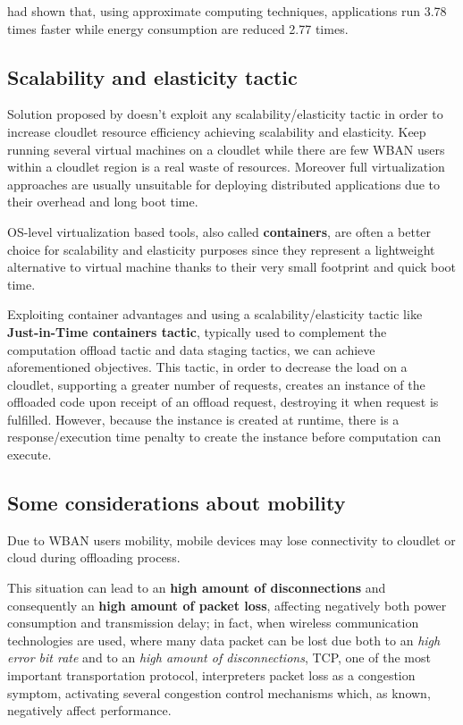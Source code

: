 \documentclass[sigchi]{acmart}
\begin{document}
\citet{ApproximateComputingArticle} had shown that, using approximate computing techniques, applications run 3.78 times faster while energy consumption are reduced 2.77 times.

\subsection{Scalability and elasticity tactic}

Solution proposed by \citet{MSAReport} doesn't exploit any scalability/elasticity tactic in order to increase cloudlet resource efficiency achieving scalability and elasticity. Keep running several virtual machines on a cloudlet while there are few WBAN users within a cloudlet region is a real waste of resources. Moreover full virtualization approaches are usually unsuitable for deploying distributed applications due to their overhead and long boot time.

OS-level virtualization based tools, also called \textbf{containers}, are often a better choice for scalability and elasticity purposes since they represent a lightweight alternative to virtual machine thanks to their very small footprint and quick boot time. 

Exploiting container advantages and using a scalability/elasticity tactic like \textbf{Just-in-Time containers tactic}, typically used to complement the computation offload tactic and data staging tactics, we can achieve aforementioned objectives. This tactic, in order to decrease the load on a cloudlet, supporting a greater number of requests, creates an instance of the offloaded code upon receipt of an offload request, destroying it when request is fulfilled. However, because the instance is created at runtime, there is a response/execution time penalty to create the instance before computation can execute.\cite{DecisionModel}\cite{ArchitecturalTacticsCyberForaging}

\subsection{Some considerations about mobility}

Due to WBAN users mobility, mobile devices may lose connectivity to cloudlet or cloud during offloading process. 

This situation can lead to an \textbf{high amount of disconnections} and consequently an \textbf{high amount of packet loss}, affecting negatively both power consumption and transmission delay; in fact, when wireless communication technologies are used, where many data packet can be lost due both to an \textit{high error bit rate} and to an \textit{high amount of disconnections}, TCP, one of the most important transportation protocol, interpreters packet loss as a congestion symptom, activating several congestion control mechanisms which, as known, negatively affect performance.\cite{tcp}
\end{document}
